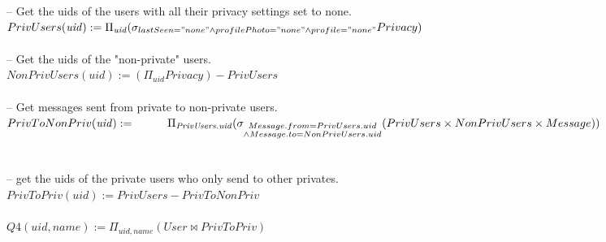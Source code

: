 \documentclass{article}
\newcommand{\var}[1]{\mathit{#1}}
\begin{document}
\begin{enumerate}
{\large
\hspace*{1cm} -- Get the uids of the users with all their privacy settings set to none. \\ [5pt]
$
PrivUsers(\var{uid}) := 
	\Pi_{\var{uid}}
	(\sigma_{lastSeen = "none" \\
			\wedge profilePhoto = "none" \\
			\wedge profile = "none"} Privacy)
$ \\\\
\hspace*{1cm} -- Get the uids of the "non-private" users. \\ [5pt]
$
NonPrivUsers(\var{uid}) :=
	(\Pi_{\var{uid}} Privacy) - PrivUsers
$ \\\\
\hspace*{1cm} -- Get messages sent from private to non-private users.	 \\ [5pt]
$
PrivToNonPriv(\var{uid}) := \\
	\hspace*{1cm}
	\Pi_{\var{PrivUsers.uid}}
	(\sigma_{\substack{Message.from = PrivUsers.uid \\
		 \wedge Message.to = NonPrivUsers.uid}}
		(PrivUsers \times NonPrivUsers \times Message))	
$ \\	\\\\
\hspace*{1cm} -- get the uids of the private users who only send to other privates. \\ [5pt]
$
PrivToPriv(\var{uid}) :=
	PrivUsers - PrivToNonPriv
$ \\\\
$
Q4(\var{uid}, name) :=
	\Pi_{\var{uid}, \var{name}} (User \bowtie PrivToPriv)
$ \\\\


}


\end{enumerate}
\end{document}
